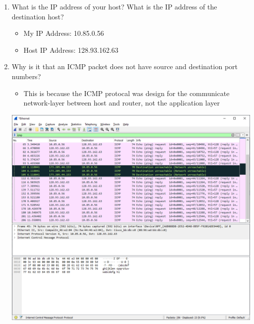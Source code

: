 \documentclass[11pt]{article}
\begin{document}
\begin{enumerate}[label=(\alph*)]
\begin{itemize}
        \begin{enumerate}[label=(\arabic*)]
            \item What is the IP address of your host? What is the IP address of the destination host? 
                \begin{itemize}
                    \item My IP Address: 10.85.0.56
                    \item Host IP Address: 128.93.162.63
                \end{itemize}
            \item Why is it that an ICMP packet does not have source and destination port numbers? 
                \begin{itemize}
                    \item This is because the ICMP protocal was design for the communicate network-layer between host and router, not the application layer
                \end{itemize}
                \begin{center}
                    \includegraphics[width=1\textwidth]{HW1Template/wireshark_ping_capture.PNG}
                \end{center}
                

\end{enumerate}
\end{itemize}
\end{enumerate}
\end{document}
